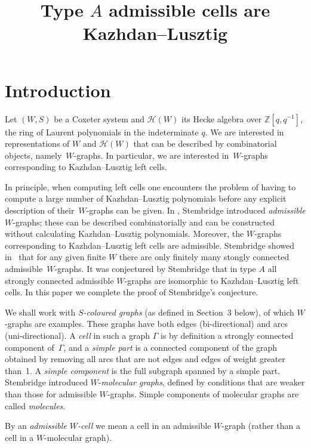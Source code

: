 \documentclass[ALCO,ThmDefs,Unicode,epreuves]{cedram}
\author{\firstname{Van} \middlename{Minh} \lastname{Nguyen}}
\title[Type $A$ admissible cells are Kazhdan--Lusztig]{Type $A$ admissible cells are Kazhdan--Lusztig}
\begin{document}
\maketitle

\section{Introduction}
\label{intro}
Let $(W,S)$ be a Coxeter system and $\mathcal{H}(W)$ its Hecke algebra over
$\mathbb{Z}[q,q^{-1}]$, the ring of Laurent polynomials in the indeterminate $q$.
We are interested in representations of $W$ and $\mathcal{H}(W)$ that can be described
by combinatorial objects, namely~$W\!$-graphs. In particular, we are interested in~$W\!$-graphs
corresponding to Kazhdan--Lusztig left cells.

In principle, when computing left cells one encounters the problem of having to compute a large number of
Kazhdan--Lusztig polynomials before any explicit description of their~$W\!$-graphs can be given.
In \cite{stem:addwgraph}, Stembridge introduced \emph{admissible\/} $W\!$-graphs; these can
be described combinatorially and can be constructed without calculating Kazhdan--Lusztig polynomials.
Moreover, the $W\!$-graphs corresponding to Kazhdan--Lusztig left cells are
admissible. Stembridge showed in~\cite{stem:finitewgraph} that for any given finite
$W$ there are only finitely many stongly connected admissible~$W\!$-graphs. It
was conjectured by Stembridge that in type $A$ all strongly connected admissible
$W$-graphs are isomorphic to Kazhdan--Lusztig left cells. In this paper we
complete the proof of Stembridge's conjecture.

We shall work with \emph{$S$-coloured graphs} (as defined in
Section~3 below), of which $W\!$-graphs are examples. These graphs
have both edges (bi-directional) and arcs (uni-directional). A
\emph{cell} in such a graph $\Gamma$ is by definition a strongly
connected component of~$\Gamma$, and a \emph{simple part} is a
connected component of the graph obtained by removing all arcs that are
not edges and edges of weight greater than~1. A \emph{simple component}
is the full subgraph spanned by a simple part. Stembridge introduced
$W\!$-\emph{molecular graphs}, defined by conditions that are weaker
than those for admissible $W\!$-graphs. Simple components of molecular
graphs are called \emph{molecules}.

By an \emph{admissible $W\!$-cell} we mean a cell in an admissible
$W\!$-graph (rather than a cell in a $W\!$-molecular graph).
\end{document}
